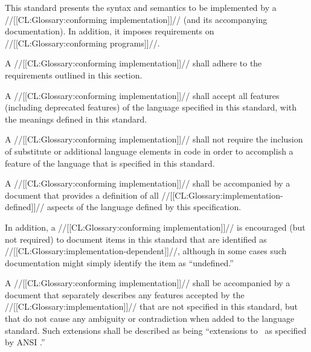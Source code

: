

This standard presents the syntax and semantics to be implemented by a //[[CL:Glossary:conforming implementation]]// (and its accompanying documentation). In addition, it imposes requirements on //[[CL:Glossary:conforming programs]]//.

  A //[[CL:Glossary:conforming implementation]]// shall adhere to the requirements outlined in this section.

 

A //[[CL:Glossary:conforming implementation]]// shall accept all features  (including deprecated features) of the language specified in this standard, with the meanings defined in this standard.

A //[[CL:Glossary:conforming implementation]]// shall not require the inclusion of substitute or additional language elements in code in order to accomplish a feature of the language that is specified in this standard.

\endsubsubsection%


A //[[CL:Glossary:conforming implementation]]// shall be accompanied by a document that provides a definition of all //[[CL:Glossary:implementation-defined]]// aspects of the language defined by this specification.

In addition, a //[[CL:Glossary:conforming implementation]]// is encouraged (but not required)  to document items in this standard that are identified as //[[CL:Glossary:implementation-dependent]]//, although in some cases such documentation might simply identify the item as ``undefined.''

\endsubsubsection%


A //[[CL:Glossary:conforming implementation]]// shall be accompanied by a document that separately describes any features accepted by the //[[CL:Glossary:implementation]]// that are not specified in this standard, but that do not cause any ambiguity or contradiction when added to the language standard.  Such extensions shall be described as being ``extensions to \clisp\ as specified by ANSI .''
  \endsubsubsection%

